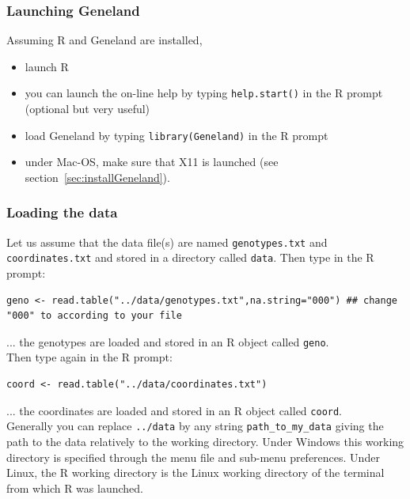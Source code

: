 \documentclass[a4paper,10pt]{article}
\begin{document}
\subsubsection{Launching {\sc Geneland}}
Assuming R and {\sc Geneland} are installed, 
\begin{itemize}
\item launch R
\item you can launch the on-line help by typing {\tt help.start()} in the R prompt (optional but very useful)
\item load {\sc Geneland} by typing {\tt library(Geneland)} in the R prompt
\item under Mac-OS, make sure that   X11 is launched (see section~\ref{sec:installGeneland}).
\end{itemize}

\subsubsection{Loading the data}


Let us assume that the data file(s) are named \texttt{genotypes.txt} and \texttt{coordinates.txt} 
and stored in a directory called \texttt{data}.
Then type in the R prompt:

\begin{verbatim}
geno <- read.table("../data/genotypes.txt",na.string="000") ## change "000" to according to your file
\end{verbatim}



... the genotypes are loaded and stored in an R object called \texttt{geno}.\\


Then type again in the R prompt:

\begin{verbatim}
coord <- read.table("../data/coordinates.txt")
\end{verbatim}



... the coordinates are loaded and stored in an R object called \texttt{coord}.\\


Generally you can replace {\tt ../data} by any string {\tt path\_to\_my\_data}  
giving the path  to the data relatively to the working directory. 
Under Windows this working directory is  specified through the menu file and sub-menu preferences. 
Under  Linux, the R working directory is the Linux working directory of the terminal  from which R was launched. 
\end{document}
